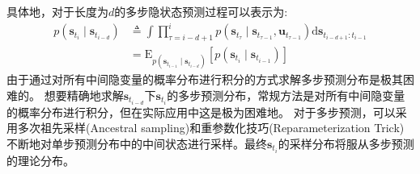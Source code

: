 具体地，对于长度为$d$的多步隐状态预测过程可以表示为:
\begin{equation}
\begin{aligned}
p\left(\boldsymbol{s}_{t_i} \mid \boldsymbol{s}_{t_{i-d}}\right) & \triangleq \int \prod_{\tau=i-d+1}^{i} p\left(\boldsymbol{s}_{t_\tau} \mid \boldsymbol{s}_{t_{\tau-1}},\boldsymbol{u}_{t_{\tau-1}}\right) \mathrm{d} \boldsymbol{s}_{t_{i-d+1}: t_{i-1}} \\
&=\mathrm{E}_{p\left(\boldsymbol{s}_{t_{i-1}} \mid \boldsymbol{s}_{t_{i-d}}\right)}\left[p\left(\boldsymbol{s}_{t_i} \mid \boldsymbol{s}_{t_{i-1}}\right)\right]
\end{aligned}
\label{equ:multistep}
\end{equation}
由于通过对所有中间隐变量的概率分布进行积分的方式求解多步预测分布是极其困难的。
想要精确地求解$\boldsymbol{s}_{t_{i-d}} $下$\boldsymbol{s}_{t_{i}}$的多步预测分布，常规方法是对所有中间隐变量的概率分布进行积分，但在实际应用中这是极为困难地。
对于多步预测，可以采用多次祖先采样(Ancestral sampling)和重参数化技巧(Reparameterization Trick)不断地对单步预测分布中的中间状态进行采样。最终$\boldsymbol{s}_{t_{i}}$的采样分布将服从多步预测的理论分布。

